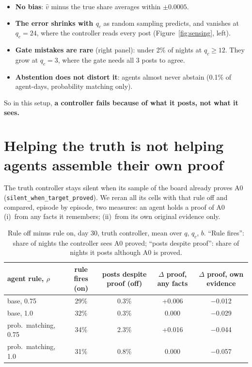 \documentclass[10pt,a4paper]{article}
\begin{document}
\begin{itemize}\itemsep1pt
\item \textbf{No bias}: $\hat v$ minus the true share averages within $\pm 0.0005$.
\item \textbf{The error shrinks with $q_c$} as random sampling predicts, and vanishes at
  $q_c = 24$, where the controller reads every post (Figure~\ref{fig:sensing}, left).
\item \textbf{Gate mistakes are rare} (right panel): under 2\% of nights at $q_c \ge 12$.
  They grow at $q_c = 3$, where the gate needs all 3 posts to agree.
\item \textbf{Abstention does not distort it}: agents almost never abstain (0.1\% of
  agent-days, probability matching only).
\end{itemize}
So in this setup, \textbf{a controller fails because of what it posts, not what it
sees.}

\section{Helping the truth is not helping agents assemble their own proof}

The truth controller stays silent when its sample of the board already proves A0
(\texttt{silent\_when\_target\_proved}). We reran all its cells with that rule off and
compared, episode by episode, two measures: an agent holds a proof of A0 (i)~from any
facts it remembers; (ii)~from its own original evidence only.

\begin{table}[H]
\centering\small
\caption{Rule off minus rule on, day 30, truth controller, mean over $q$, $q_c$, $b$. ``Rule fires'': share of nights the controller sees A0 proved; ``posts despite proof'': share of nights it posts although A0 is proved.}
\label{tab:rule}
\begin{tabular}{lcccc}
\toprule
agent rule, $\rho$ & rule fires (on) & posts despite proof (off) & $\Delta$ proof, any facts & $\Delta$ proof, own evidence \\
\midrule
base, 0.75 & 29\% & 0.3\% & +0.006 & $-$0.012 \\
base, 1.0 & 32\% & 0.3\% & 0.000 & $-$0.029 \\
prob.\ matching, 0.75 & 34\% & 2.3\% & +0.016 & $-$0.044 \\
prob.\ matching, 1.0 & 31\% & 0.8\% & 0.000 & $-$0.057 \\
\bottomrule
\end{tabular}
\end{table}
\end{document}
